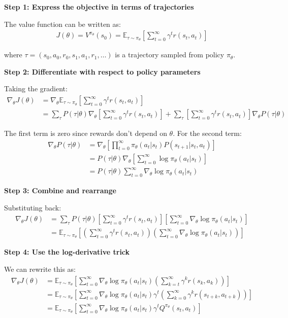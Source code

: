 \textbf{Step 1: Express the objective in terms of trajectories}

The value function can be written as:
\begin{align}
J(\theta) = V^{\pi_\theta}(s_0) = \mathbb{E}_{\tau \sim \pi_\theta} \left[ \sum_{t=0}^{\infty} \gamma^t r(s_t, a_t) \right]
\end{align}

where $\tau = (s_0, a_0, r_0, s_1, a_1, r_1, \ldots)$ is a trajectory sampled from policy $\pi_\theta$.

\textbf{Step 2: Differentiate with respect to policy parameters}

Taking the gradient:
\begin{align}
\nabla_\theta J(\theta) &= \nabla_\theta \mathbb{E}_{\tau \sim \pi_\theta} \left[ \sum_{t=0}^{\infty} \gamma^t r(s_t, a_t) \right] \\
&= \sum_{\tau} P(\tau|\theta) \nabla_\theta \left[ \sum_{t=0}^{\infty} \gamma^t r(s_t, a_t) \right] + \sum_{\tau} \left[ \sum_{t=0}^{\infty} \gamma^t r(s_t, a_t) \right] \nabla_\theta P(\tau|\theta)
\end{align}

The first term is zero since rewards don't depend on $\theta$. For the second term:
\begin{align}
\nabla_\theta P(\tau|\theta) &= \nabla_\theta \left[ \prod_{t=0}^{\infty} \pi_\theta(a_t|s_t) P(s_{t+1}|s_t, a_t) \right] \\
&= P(\tau|\theta) \nabla_\theta \left[ \sum_{t=0}^{\infty} \log \pi_\theta(a_t|s_t) \right] \\
&= P(\tau|\theta) \sum_{t=0}^{\infty} \nabla_\theta \log \pi_\theta(a_t|s_t)
\end{align}

\textbf{Step 3: Combine and rearrange}

Substituting back:
\begin{align}
\nabla_\theta J(\theta) &= \sum_{\tau} P(\tau|\theta) \left[ \sum_{t=0}^{\infty} \gamma^t r(s_t, a_t) \right] \left[ \sum_{t=0}^{\infty} \nabla_\theta \log \pi_\theta(a_t|s_t) \right] \\
&= \mathbb{E}_{\tau \sim \pi_\theta} \left[ \left( \sum_{t=0}^{\infty} \gamma^t r(s_t, a_t) \right) \left( \sum_{t=0}^{\infty} \nabla_\theta \log \pi_\theta(a_t|s_t) \right) \right]
\end{align}

\textbf{Step 4: Use the log-derivative trick}

We can rewrite this as:
\begin{align}
\nabla_\theta J(\theta) &= \mathbb{E}_{\tau \sim \pi_\theta} \left[ \sum_{t=0}^{\infty} \nabla_\theta \log \pi_\theta(a_t|s_t) \left( \sum_{k=t}^{\infty} \gamma^k r(s_k, a_k) \right) \right] \\
&= \mathbb{E}_{\tau \sim \pi_\theta} \left[ \sum_{t=0}^{\infty} \nabla_\theta \log \pi_\theta(a_t|s_t) \gamma^t \left( \sum_{k=0}^{\infty} \gamma^k r(s_{t+k}, a_{t+k}) \right) \right] \\
&= \mathbb{E}_{\tau \sim \pi_\theta} \left[ \sum_{t=0}^{\infty} \nabla_\theta \log \pi_\theta(a_t|s_t) \gamma^t Q^{\pi_\theta}(s_t, a_t) \right]
\end{align}

